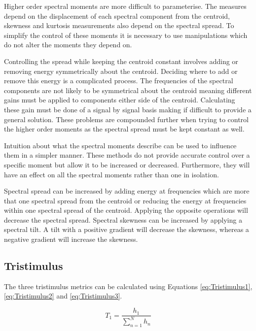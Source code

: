 		Higher order spectral moments are more difficult to parameterise. The measures depend on the displacement
		of each spectral component from the centroid, skewness and kurtosis measurements also depend on the
		spectral spread. To simplify the control of these moments it is necessary to use manipulations which do not
		alter the moments they depend on. 
		
		Controlling the spread while keeping the centroid constant involves adding or removing energy symmetrically
		about the centroid. Deciding where to add or remove this energy is a complicated process. The frequencies
		of the spectral components are not likely to be symmetrical about the centroid meaning different gains must
		be applied to components either side of the centroid. Calculating these gain must be done of a signal by
		signal basis making if difficult to provide a general solution. These problems are compounded further when
		trying to control the higher order moments as the spectral spread must be kept constant as well.

		Intuition about what the spectral moments describe can be used to influence them in a simpler manner. These
		methods do not provide accurate control over a specific moment but allow it to be increased or decreased.
		Furthermore, they will have an effect on all the spectral moments rather than one in isolation. 
		
		Spectral spread can be increased by adding energy at frequencies which are more that one spectral spread
		from the centroid or reducing the energy at frequencies within one spectral spread of the centroid.
		Applying the opposite operations will decrease the spectral spread. Spectral skewness can be increased by
		applying a spectral tilt. A tilt with a positive gradient will decrease the skewness, whereas a negative
		gradient will increase the skewness. 

	\subsection{Tristimulus}
	\label{sec:FeatureControl-Parameterisation-Tristimulus}
		The three tristimulus metrics can be calculated using Equations \ref{eq:Tristimulus1},
		\ref{eq:Tristimulus2} and \ref{eq:Tristimulus3}.
		
		\begin{equation}
			T_{1} = \frac{h_{1}}{\sum_{n = 1}^{N} h_{n}}
			\label{eq:Tristimulus1}
		\end{equation}

